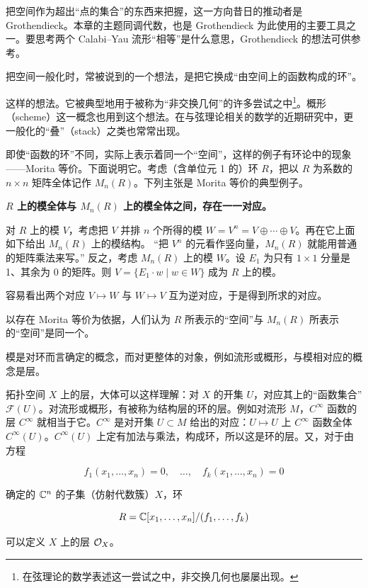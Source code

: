 把空间作为超出“点的集合”的东西来把握，这一方向昔日的推动者是 Grothendieck。本章的主题同调代数，也是 Grothendieck 为此使用的主要工具之一。要思考两个 Calabi--Yau 流形“相等”是什么意思，Grothendieck 的想法可供参考。

把空间一般化时，常被说到的一个想法，是把它换成“由空间上的函数构成的环”。

这样的想法。它被典型地用于被称为“非交换几何”的许多尝试之中\footnote{在弦理论的数学表述这一尝试之中，非交换几何也屡屡出现。}。概形（scheme）这一概念也用到这个想法。在与弦理论相关的数学的近期研究中，更一般化的“叠”（stack）之类也常常出现。

即使“函数的环”不同，实际上表示着同一个“空间”，这样的例子有环论中的现象——Morita 等价。下面说明它。考虑（含单位元 1 的）环 $R$，把以 $R$ 为系数的 $n\times n$ 矩阵全体记作 $M_n(R)$。下列主张是 Morita 等价的典型例子。

\par\medskip
\noindent\textbf{$R$ 上的模全体与 $M_n(R)$ 上的模全体之间，存在一一对应。}
\par\medskip

对 $R$ 上的模 $V$，考虑把 $V$ 并排 $n$ 个所得的模 $W = V^n = V\oplus\cdots\oplus V$。再在它上面如下给出 $M_n(R)$ 上的模结构。
“把 $V^n$ 的元看作竖向量，$M_n(R)$ 就能用普通的矩阵乘法来写。”
反之，考虑 $M_n(R)$ 上的模 $W$。设 $E_1$ 为只有 $1\times1$ 分量是 1、其余为 0 的矩阵。则 $V = \{E_1\cdot w \mid w \in W\}$ 成为 $R$ 上的模。

容易看出两个对应 $V \mapsto W$ 与 $W \mapsto V$ 互为逆对应，于是得到所求的对应。

以存在 Morita 等价为依据，人们认为 $R$ 所表示的“空间”与 $M_n(R)$ 所表示的“空间”是同一个。

模是对环而言确定的概念，而对更整体的对象，例如流形或概形，与模相对应的概念是层。

拓扑空间 $X$ 上的层，大体可以这样理解：对 $X$ 的开集 $U$，对应其上的“函数集合”$\mathcal{F}(U)$。对流形或概形，有被称为结构层的环的层。例如对流形 $M$，$C^\infty$ 函数的层 $C^\infty$ 就相当于它。$C^\infty$ 是对开集 $U\subset M$ 给出的对应：$U\mapsto U$ 上 $C^\infty$ 函数全体 $C^\infty(U)$。$C^\infty(U)$ 上定有加法与乘法，构成环，所以这是环的层。又，对于由方程

\[
  f_1(x_1,\dots,x_n) = 0,\quad \dots,\quad f_k(x_1,\dots,x_n) = 0
\]

确定的 $\mathbb{C}^n$ 的子集（仿射代数簇）$X$，环

\[
  R = \mathbb{C}[x_1,\dots,x_n]/(f_1,\dots,f_k)
\]

可以定义 $X$ 上的层 $\mathcal{O}_X$。

